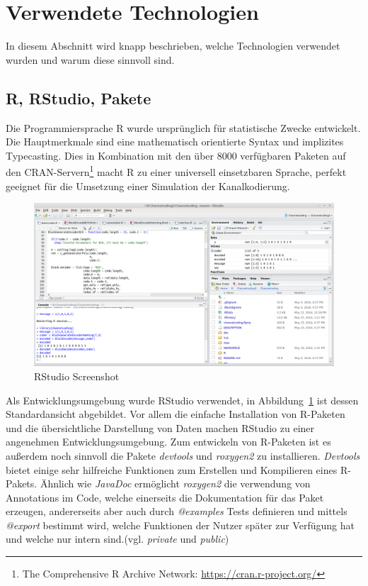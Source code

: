 
\section{Verwendete Technologien}
\label{section:technologies}

In diesem Abschnitt wird knapp beschrieben, welche Technologien verwendet wurden und warum diese sinnvoll sind.

\subsection{R, RStudio, Pakete}

Die Programmiersprache R wurde ursprünglich für statistische Zwecke entwickelt. Die Hauptmerkmale sind eine mathematisch orientierte Syntax und implizites Typecasting. Dies in Kombination mit den über 8000 verfügbaren Paketen auf den CRAN-Servern\footnote{The Comprehensive R Archive Network: \url{https://cran.r-project.org/}} macht R zu einer universell einsetzbaren Sprache, perfekt geeignet für die Umsetzung einer Simulation der Kanalkodierung.\cite{rmanual}

\begin{figure}[t]
\centering
\includegraphics[width=\ScaleIfNeeded]{pictures/rstudio}
\caption{RStudio Screenshot}
\label{pic:rstudio}
\end{figure}

Als Entwicklungsumgebung wurde RStudio verwendet, in Abbildung~\ref{pic:rstudio} ist dessen Standardansicht abgebildet. Vor allem die einfache Installation von R-Paketen und die übersichtliche Darstellung von Daten machen RStudio zu einer angenehmen Entwicklungsumgebung. Zum entwickeln von R-Paketen ist es außerdem noch sinnvoll die Pakete \emph{devtools} und \emph{roxygen2} zu installieren. \emph{Devtools} bietet einige sehr hilfreiche Funktionen zum Erstellen und Kompilieren eines R-Pakets.\cite{devtools} Ähnlich wie \emph{JavaDoc} ermöglicht \emph{roxygen2} die verwendung von Annotations im Code, welche einerseits die Dokumentation für das Paket erzeugen, andererseits aber auch durch \emph{@examples} Tests definieren und mittels \emph{@export} bestimmt wird, welche Funktionen der Nutzer später zur Verfügung hat und welche nur intern sind.(vgl. \emph{private} und \emph{public})\cite{roxygen}

